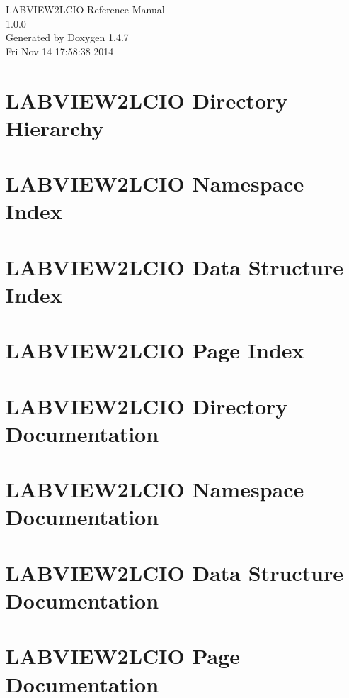 \documentclass[a4paper]{book}
\begin{document}
\begin{titlepage}
\vspace*{7cm}
\begin{center}
{\Large LABVIEW2LCIO Reference Manual\\[1ex]\large 1.0.0 }\\
\vspace*{1cm}
{\large Generated by Doxygen 1.4.7}\\
\vspace*{0.5cm}
{\small Fri Nov 14 17:58:38 2014}\\
\end{center}
\end{titlepage}
\clearemptydoublepage
{}
\tableofcontents
\clearemptydoublepage
{}
\chapter{LABVIEW2LCIO Directory Hierarchy}

\chapter{LABVIEW2LCIO Namespace Index}

\chapter{LABVIEW2LCIO Data Structure Index}

\chapter{LABVIEW2LCIO Page Index}

\chapter{LABVIEW2LCIO Directory Documentation}




\chapter{LABVIEW2LCIO Namespace Documentation}



\chapter{LABVIEW2LCIO Data Structure Documentation}












\chapter{LABVIEW2LCIO Page Documentation}

\printindex
\end{document}
